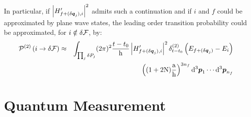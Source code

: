 \documentclass[10pt,a4paper,twoside,openany]{book}
\begin{document}
In particular, if $\left| H'_{f + (\delta \q_j),i} \right|^2$ admits such a continuation and if $i$ and $f$ could be approximated by plane wave states, the leading order transition probability could be approximated, for $i \notin \delta \F$, by:
\begin{eqnarray*}
\TPn i {\delta \F} 2 & \approx & \int_{\prod_j \delta P_j} ( 2 \pi )^2 \frac{t - t_0} \h \left| H'_{f + (\delta \q_j),i} \right|^2 \deltaE2{E_{f + (\delta \q_j)} - E_i} \\
&& \left( (1 + 2 \N) \frac \a \h \right)^{3 n_f} \dtp_1 \dotsm \dtp_{n_f}
\end{eqnarray*}

\section{Quantum Measurement}
\end{document}
